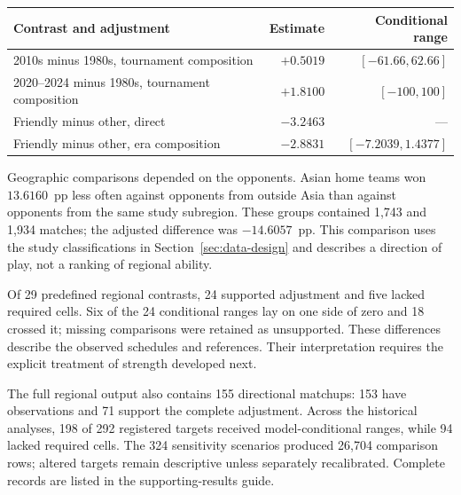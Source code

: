 \begin{table}[htbp]
\centering\small
{}
\label{tab:historical-contrasts}
\begin{tabular}{p{7.4cm}rr}
\toprule
Contrast and adjustment & Estimate & Conditional range \\
\midrule
2010s minus 1980s, tournament composition & $+0.5019$ & $[-61.66,62.66]$ \\
2020--2024 minus 1980s, tournament composition & $+1.8100$ & $[-100,100]$ \\
Friendly minus other, direct & $-3.2463$ & --- \\
Friendly minus other, era composition & $-2.8831$ & $[-7.2039,1.4377]$ \\
\bottomrule
\end{tabular}
\end{table}

Geographic comparisons depended on the opponents. Asian home teams won $13.6160$~pp less often against opponents from outside Asia than against opponents from the same study subregion. These groups contained 1,743 and 1,934 matches; the adjusted difference was $-14.6057$~pp. This comparison uses the study classifications in Section~\ref{sec:data-design} and describes a direction of play, not a ranking of regional ability.

Of 29 predefined regional contrasts, 24 supported adjustment and five lacked required cells. Six of the 24 conditional ranges lay on one side of zero and 18 crossed it; missing comparisons were retained as unsupported. These differences describe the observed schedules and references. Their interpretation requires the explicit treatment of strength developed next.

The full regional output also contains 155 directional matchups: 153 have observations and 71 support the complete adjustment. Across the historical analyses, 198 of 292 registered targets received model-conditional ranges, while 94 lacked required cells. The 324 sensitivity scenarios produced 26,704 comparison rows; altered targets remain descriptive unless separately recalibrated. Complete records are listed in the supporting-results guide.



